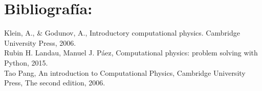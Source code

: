 \documentclass[11.5pt,a4paper]{article}
\begin{document}
\section{Bibliografía:}

Klein, A., \& Godunov, A., Introductory computational physics. Cambridge University Press, 2006.\\

Rubin H. Landau, Manuel J. Páez, Computational physics: problem solving with Python, 2015.\\

Tao Pang, An introduction to Computational Physics, Cambridge University Press, The
second edition, 2006.
\end{document}
